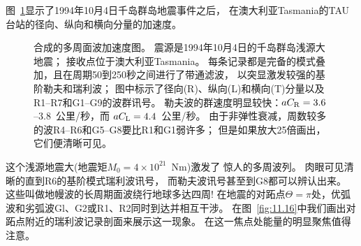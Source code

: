 图~\ref{fig:11.15}显示了1994年10月4日千岛群岛地震事件之后，
%
在澳大利亚Tasmania的TAU台站的径向、纵向和横向分量的加速度。
\begin{figure}[!b]
\begin{center}
\end{center}
\caption[multi-orbit]{
\label{fig:11.15}
合成的多周面波加速度图。
震源是1994年10月4日的千岛群岛浅源大地震；
接收点位于澳大利亚Tasmania。
每条记录都是完备的模式叠加，且在周期50到250秒之间进行了带通滤波，
以突显激发较强的基阶勒夫和瑞利波；
图中标示了径向(R)、纵向(L)和横向(T)分量以及R1--R7和G1--G9的波群讯号。
勒夫波的群速度明显较快：$aC_{\rm R}=3.6$--3.8~公里/秒，而 $aC_{\rm L}=4.4$~公里/秒。
由于非弹性衰减，周数较多的波R4--R6和G5--G8要比R1和G1弱许多；
但是如果放大25倍画出，它们便清晰可见。
}
\end{figure}
这个浅源地震大(地震矩$M_0=4\times 10^{21}$~N\hspace{0.5 mm}m)激发了
惊人的多周波列。
肉眼可见清晰的直到R6的基阶模式瑞利波讯号，
而勒夫波讯号甚至到G8都可以辨认出来。
这些叫做地幔波的长周期面波绕行地球多达四周!
%
在地震的对跖点$\Theta=\pi$处，优弧波和劣弧波Gl、G2或R1、R2同时到达并相互干涉。 
在图~\ref{fig:11.16}中我们画出对跖点附近的瑞利波记录剖面来展示这一现象。
在这一焦点处能量的明显聚焦值得注意。
